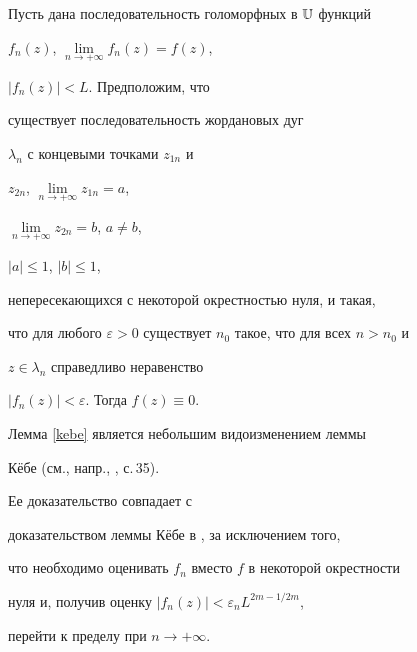 \begin{lem}\label{kebe}


Пусть дана последовательность голоморфных в $\Bbb U$ функций


$f_n(z)$, $\lim\limits_{n\to+\infty}f_n(z)=f(z)$,


$|f_n(z)|<L$. Предположим, что


существует последовательность жордановых дуг


$\lambda_n$ с концевыми точками $z_{1n}$ и


$z_{2n}$, $\lim\limits_{n\to+\infty}z_{1n}=a$,


$\lim\limits_{n\to+\infty}z_{2n}=b$, $a\neq b$,


$|a|\leqslant1$, $|b|\leqslant1$,


непересекающихся с некоторой окрестностью нуля, и такая,


что для любого $\varepsilon>0$ существует $n_0$ такое, что для всех $n>n_0$ и


$z\in\lambda_n$ справедливо неравенство


$|f_n(z)|<\varepsilon$. Тогда $f(z)\equiv0$.


\end{lem}





\begin{pf}


Лемма \ref{kebe} является небольшим видоизменением леммы


К\"ебе (см., напр., \cite{Goluzin}, с.\,35).


Ее доказательство совпадает с


доказательством леммы К\"ебе в \cite{Goluzin}, за исключением того,


что необходимо оценивать $f_n$ вместо $f$ в некоторой окрестности


нуля и, получив оценку $|f_n(z)|<\varepsilon_n L^{2m-1/2m}$,


перейти к пределу при $n\to+\infty$.


\end{pf}





